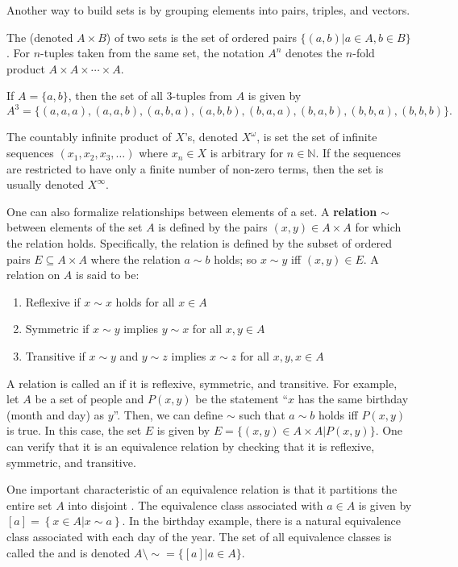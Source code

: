 Another way to build sets is by grouping elements into pairs, triples, and vectors.
\begin{definition}
The  (denoted $A\times B$) of two sets is the set of ordered pairs $\{(a,b) | a\in A, b\in B\}$.
For $n$-tuples taken from the same set, the notation $A^n$ denotes the $n$-fold product $A\times A \times \cdots \times A$.
\end{definition}
\begin{example}
If $A  = \{ a,b \}$, then the set of all 3-tuples from $A$ is given by 
\begin{equation*}
A^3 = \{ (a,a,a),(a,a,b),(a,b,a),(a,b,b),(b,a,a),(b,a,b),(b,b,a),(b,b,b) \}.
\end{equation*}
\end{example}
The countably infinite product of $X$'s, denoted $X^\omega$, is set the set of infinite sequences $(x_1,x_2,x_3,\ldots)$ where $x_n \in X$ is arbitrary for $n\in \mathbb{N}$.
If the sequences are restricted to have only a finite number of non-zero terms, then the set is usually denoted $X^\infty$.

One can also formalize relationships between elements of a set.
A \textbf{relation} $\sim$ between elements of the set $A$ is defined by the pairs $(x,y)\in A\times A$ for which the relation holds.
Specifically, the relation is defined by the subset of ordered pairs $E\subseteq A\times A$ where the relation $a\sim b$ holds; so $x\sim y$ iff $(x,y)\in E$.
A relation on $A$ is said to be:
\begin{enumerate}
\item Reflexive if $x\sim x$ holds for all $x\in A$
\item Symmetric if $x\sim y$ implies $y\sim x$ for all $x,y\in A$
\item Transitive if $x\sim y$ and $y\sim z$ implies $x\sim z$ for all $x,y,x\in A$
\end{enumerate}

A relation is called an  if it is reflexive, symmetric, and transitive.
For example, let $A$ be a set of people and $P(x,y)$ be the statement ``$x$ has the same birthday (month and day) as $y$''.
Then, we can define $\sim$ such that $a\sim b$ holds iff $P(x,y)$ is true.
In this case, the set $E$ is given by $E = \{ (x,y)\in A\times A | P(x,y) \}$.
One can verify that it is an equivalence relation by checking that it is reflexive, symmetric, and transitive.

One important characteristic of an equivalence relation is that it partitions the entire set $A$ into disjoint .
The equivalence class associated with $a\in A$ is given by  $[a] = \left\{x\in A | x \sim a\right\}$.
In the birthday example, there is a natural equivalence class associated with each day of the year.
The set of all equivalence classes is called the  and is denoted $A \setminus \!\sim = \{ [a] | a\in A \}$.

